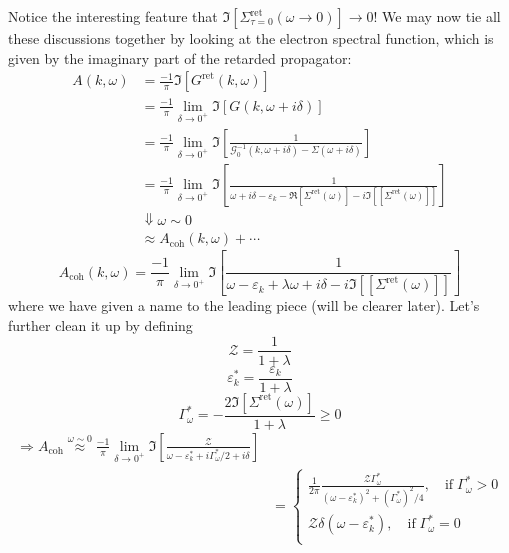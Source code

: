 Notice the interesting feature that $\Im \left[ \Sigma _{\tau =0}^{\mathrm{ret}}\left( \omega \rightarrow 0 \right) \right] \rightarrow 0$! We may now tie all these discussions together by looking at the electron spectral function, which is given by the imaginary part of the retarded propagator:
\begin{align*}
    A\left( k,\omega \right) &=\frac{-1}{\pi}\Im \left[ G^{\mathrm{ret}}\left( k,\omega \right) \right] \\
    &=\frac{-1}{\pi}\lim_{\delta \rightarrow 0^+} \Im \left[ G\left( k,\omega +i\delta \right) \right] \\
    &=\frac{-1}{\pi}\lim_{\delta \rightarrow 0^+} \Im \left[ \frac{1}{\mathcal{G} _{0}^{-1}\left( k,\omega +i\delta \right) -\Sigma \left( \omega +i\delta \right)} \right] \\
    &=\frac{-1}{\pi}\lim_{\delta \rightarrow 0^+} \Im \left[ \frac{1}{\omega +i\delta -\varepsilon _k-\Re \left[ \Sigma ^{\mathrm{ret}}\left( \omega \right) \right] -i\Im \left[ \left[ \Sigma ^{\mathrm{ret}}\left( \omega \right) \right] \right]} \right] \\
    &\Downarrow \omega \sim 0\\
    &\approx A_{\mathrm{coh}}\left( k,\omega \right) +\cdots
\end{align*}
\[ A_{\mathrm{coh}}\left( k,\omega \right) =\frac{-1}{\pi}\lim_{\delta \rightarrow 0^+} \Im \left[ \frac{1}{\omega -\varepsilon _k+\lambda \omega +i\delta -i\Im \left[ \left[ \Sigma ^{\mathrm{ret}}\left( \omega \right) \right] \right]} \right] \]
where we have given a name to the leading piece (will be clearer later). Let's further clean it up by defining
\[ \mathcal{Z} =\frac{1}{1+\lambda}\]
\[ \varepsilon _{k}^{*}=\frac{\varepsilon _k}{1+\lambda}\]
\[ \Gamma _{\omega}^{*}=-\frac{2\Im \left[ \Sigma ^{\mathrm{ret}}\left( \omega \right) \right]}{1+\lambda}\ge 0\]
\begin{align*}
    \Rightarrow A_{\mathrm{coh}}\stackrel{\omega\sim 0}{\approx}\frac{-1}{\pi}\lim_{\delta \rightarrow 0^+} \Im \left[ \frac{\mathcal{Z}}{\omega -\varepsilon _{k}^{*}+i\Gamma _{\omega}^{*}/2+i\delta} \right] \\
    &=\begin{cases}
        \frac{1}{2\pi}\frac{\mathcal{Z} \Gamma _{\omega}^{*}}{\left( \omega -\varepsilon _{k}^{*} \right) ^2+\left( \Gamma _{\omega}^{*} \right) ^2/4},\quad \mathrm{if}\; \Gamma _{\omega}^{*}>0\\
        \mathcal{Z} \delta \left( \omega -\varepsilon _{k}^{*} \right) ,\quad \mathrm{if}\; \Gamma _{\omega}^{*}=0\\
    \end{cases}\\
\end{align*}
